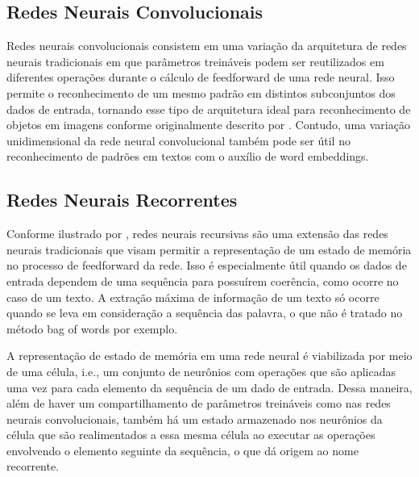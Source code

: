 \subsection{Redes Neurais Convolucionais}
Redes neurais convolucionais consistem em uma variação da arquitetura de redes neurais tradicionais em que parâmetros treináveis podem ser reutilizados em diferentes operações durante o cálculo de feedforward de uma rede neural. Isso permite o reconhecimento de um mesmo padrão em distintos subconjuntos dos dados de entrada, tornando esse tipo de arquitetura ideal para reconhecimento de objetos em imagens conforme originalmente descrito por \cite{LeCun1999}. Contudo, uma variação unidimensional da rede neural convolucional também pode ser útil no reconhecimento de padrões em textos com o auxílio de word embeddings.

\subsection{Redes Neurais Recorrentes}

Conforme ilustrado por \cite{ColahLSTM}, redes neurais recursivas são uma extensão das redes neurais tradicionais que visam permitir a representação de um estado de memória no processo de feedforward da rede. Isso é especialmente útil quando os dados de entrada dependem de uma sequência para possuírem coerência, como ocorre no caso de um texto. A extração máxima de informação de um texto só ocorre quando se leva em consideração a sequência das palavra, o que não é tratado no método bag of words por exemplo.

A representação de estado de memória em uma rede neural é viabilizada por meio de uma célula, i.e., um conjunto de neurônios com operações que são aplicadas uma vez para cada elemento da sequência de um dado de entrada. Dessa maneira, além de haver um compartilhamento de parâmetros treináveis como nas redes neurais convolucionais, também há um estado armazenado nos neurônios da célula que são realimentados a essa mesma célula ao executar as operações envolvendo o elemento seguinte da sequência, o que dá origem ao nome recorrente.
